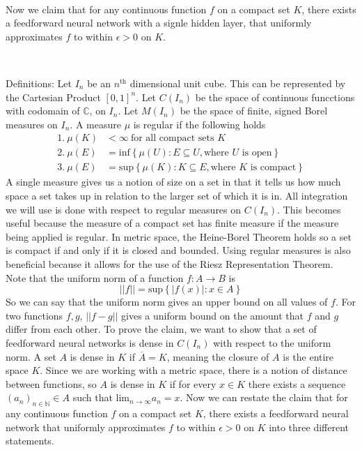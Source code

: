 \documentclass[12 pt]{article}
\theoremstyle{definition}
\newcommand{\C}{\mathbb{C}}
\newcommand{\N}{\mathbb{N}}
\begin{document}
\

Now we claim that for any continuous function $f$ on a compact set $K$, there exists a feedforward neural network with a signle hidden layer, that uniformly approximates $f$ to within $\epsilon > 0$ on $K$. 

\

Definitions: Let $I_{n}$ be an $n^{\text{th}}$ dimensional unit cube. This can be represented by the Cartesian Product $[0,1]^{n}$. Let $C(I_{n})$ be the space of continuous funcctions with codomain of $\C$, on $I_{n}$. Let $M(I_{n})$ be the space of finite, signed Borel measures on $I_{n}$. A measure $\mu$ is regular if the following holds
\begin{equation*}
\begin{split}
1. \ \mu(K) &< \infty \ \text{for all compact sets $K$} \\
2. \ \mu(E) &= \text{inf} \left\{ \mu(U) : E \subseteq U, \text{where $U$ is open} \right\} \\
3. \ \mu(E) &= \text{sup} \left\{ \mu(K) : K \subseteq E, \text{where $K$ is compact} \right\} 
\end{split}
\end{equation*}
A single measure gives us a notion of size on a set in that it tells us how much space a set takes up in relation to the larger set of which it is in. All integration we will use is done with respect to regular measures on $C(I_{n})$. This becomes useful because the measure of a compact set has finite measure if the measure being applied is regular. In metric space, the Heine-Borel Theorem holds so a set is compact if and only if it is closed and bounded. Using regular measures is also beneficial because it allows for the use of the Riesz Representation Theorem. Note that the uniform norm of a function $f: A \rightarrow B$ is 
\begin{equation*}
||f|| = \text{sup} \left\{ |f(x)| : x \in A \right\}
\end{equation*}
So we can say that the uniform norm gives an upper bound on all values of $f$. For two functions $f, g$, $||f- g||$ gives a uniform bound on the amount that $f$ and $g$ differ from each other. To prove the claim, we want to show that a set of feedforward neural networks is dense in $C(I_{n})$ with respect to the uniform norm. A set $A$ is dense in $K$ if $\overline{A} = K$, meaning the closure of $A$ is the entire space $K$. Since we are working with a metric space, there is a notion of distance between functions, so $A$ is dense in $K$ if for every $x \in K$ there exists a sequence $(a_{n})_{n \in \N} \in A$ such that $\text{lim}_{n \rightarrow \infty}a_{n} = x$. Now we can restate the claim that for any continuous function $f$ on a compact set $K$, there exists a feedforward neural network that uniformly approximates $f$ to within $\epsilon > 0$ on $K$ into three different statements. 
\end{document}
